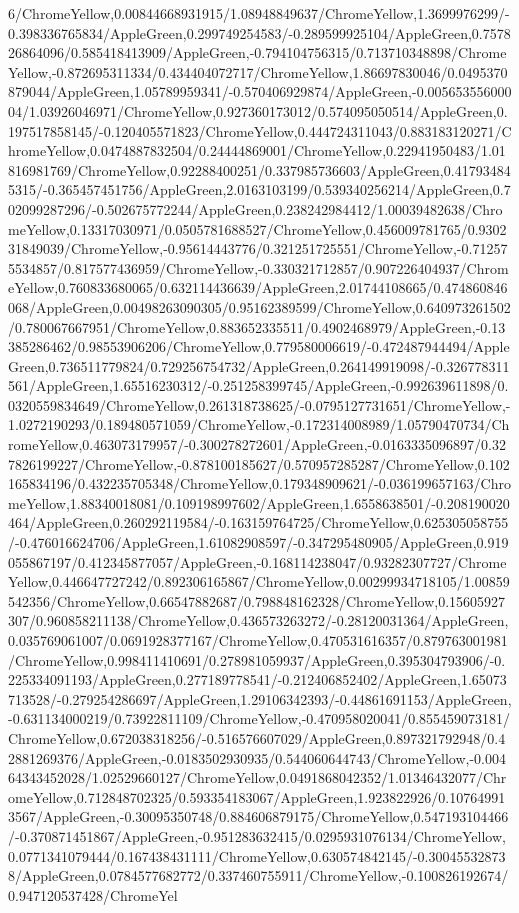 {\begin{tikzternal}
6/ChromeYellow,0.00844668931915/1.08948849637/ChromeYellow,1.3699976299/-0.398336765834/AppleGreen,0.299749254583/-0.289599925104/AppleGreen,0.757826864096/0.585418413909/AppleGreen,-0.794104756315/0.713710348898/ChromeYellow,-0.872695311334/0.434404072717/ChromeYellow,1.86697830046/0.0495370879044/AppleGreen,1.05789959341/-0.570406929874/AppleGreen,-0.00565355600004/1.03926046971/ChromeYellow,0.927360173012/0.574095050514/AppleGreen,0.197517858145/-0.120405571823/ChromeYellow,0.444724311043/0.883183120271/ChromeYellow,0.0474887832504/0.24444869001/ChromeYellow,0.22941950483/1.01816981769/ChromeYellow,0.92288400251/0.337985736603/AppleGreen,0.417934845315/-0.365457451756/AppleGreen,2.0163103199/0.539340256214/AppleGreen,0.702099287296/-0.502675772244/AppleGreen,0.238242984412/1.00039482638/ChromeYellow,0.13317030971/0.0505781688527/ChromeYellow,0.456009781765/0.930231849039/ChromeYellow,-0.95614443776/0.321251725551/ChromeYellow,-0.712575534857/0.817577436959/ChromeYellow,-0.330321712857/0.907226404937/ChromeYellow,0.760833680065/0.632114436639/AppleGreen,2.01744108665/0.474860846068/AppleGreen,0.00498263090305/0.95162389599/ChromeYellow,0.640973261502/0.780067667951/ChromeYellow,0.883652335511/0.4902468979/AppleGreen,-0.13385286462/0.98553906206/ChromeYellow,0.779580006619/-0.472487944494/AppleGreen,0.736511779824/0.729256754732/AppleGreen,0.264149919098/-0.326778311561/AppleGreen,1.65516230312/-0.251258399745/AppleGreen,-0.992639611898/0.0320559834649/ChromeYellow,0.261318738625/-0.0795127731651/ChromeYellow,-1.0272190293/0.189480571059/ChromeYellow,-0.172314008989/1.05790470734/ChromeYellow,0.463073179957/-0.300278272601/AppleGreen,-0.0163335096897/0.327826199227/ChromeYellow,-0.878100185627/0.570957285287/ChromeYellow,0.102165834196/0.432235705348/ChromeYellow,0.179348909621/-0.036199657163/ChromeYellow,1.88340018081/0.109198997602/AppleGreen,1.6558638501/-0.208190020464/AppleGreen,0.260292119584/-0.163159764725/ChromeYellow,0.625305058755/-0.476016624706/AppleGreen,1.61082908597/-0.347295480905/AppleGreen,0.919055867197/0.412345877057/AppleGreen,-0.168114238047/0.93282307727/ChromeYellow,0.446647727242/0.892306165867/ChromeYellow,0.00299934718105/1.00859542356/ChromeYellow,0.66547882687/0.798848162328/ChromeYellow,0.15605927307/0.960858211138/ChromeYellow,0.436573263272/-0.28120031364/AppleGreen,0.035769061007/0.0691928377167/ChromeYellow,0.470531616357/0.879763001981/ChromeYellow,0.998411410691/0.278981059937/AppleGreen,0.395304793906/-0.225334091193/AppleGreen,0.277189778541/-0.212406852402/AppleGreen,1.65073713528/-0.279254286697/AppleGreen,1.29106342393/-0.44861691153/AppleGreen,-0.631134000219/0.73922811109/ChromeYellow,-0.470958020041/0.855459073181/ChromeYellow,0.672038318256/-0.516576607029/AppleGreen,0.897321792948/0.42881269376/AppleGreen,-0.0183502930935/0.544060644743/ChromeYellow,-0.00464343452028/1.02529660127/ChromeYellow,0.0491868042352/1.01346432077/ChromeYellow,0.712848702325/0.593354183067/AppleGreen,1.923822926/0.107649913567/AppleGreen,-0.30095350748/0.884606879175/ChromeYellow,0.547193104466/-0.370871451867/AppleGreen,-0.951283632415/0.0295931076134/ChromeYellow,0.0771341079444/0.167438431111/ChromeYellow,0.630574842145/-0.300455328738/AppleGreen,0.0784577682772/0.337460755911/ChromeYellow,-0.100826192674/0.947120537428/ChromeYel
\end{tikzternal}}
